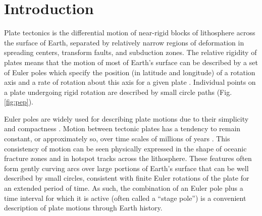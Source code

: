 \documentclass[11pt,letterpaper]{article}
\begin{document}

\section*{Introduction}

Plate tectonics is the differential motion of near-rigid blocks of lithosphere across the surface of Earth, separated by relatively narrow regions of deformation in spreading centers, transform faults, and subduction zones. The relative rigidity of plates means that the motion of most of Earth's surface can be described by a set of Euler poles which specify the position (in latitude and longitude) of a rotation axis and a rate of rotation about this axis for a given plate \citep[cf.][]{Cox2009a}. Individual points on a plate undergoing rigid rotation are described by small circle paths (Fig. \ref{fig:pep}).

Euler poles are widely used for describing plate motions due to their simplicity and compactness \citep[e.g.][]{DeMets2010a, Argus2011a}. Motion between tectonic plates has a tendency to remain constant, or approximately so, over time scales of millions of years \citep[e.g.][]{Iaffaldano2012a, Muller2016a}. This consistency of motion can be seen physically expressed in the shape of oceanic fracture zones and in hotspot tracks across the lithosphere. These features often form gently curving arcs over large portions of Earth's surface that can be well described by small circles, consistent with finite Euler rotations of the plate for an extended period of time. As such, the combination of an Euler pole plus a time interval for which it is active (often called a ``stage pole'') is a convenient description of plate motions through Earth history.
\end{document}
